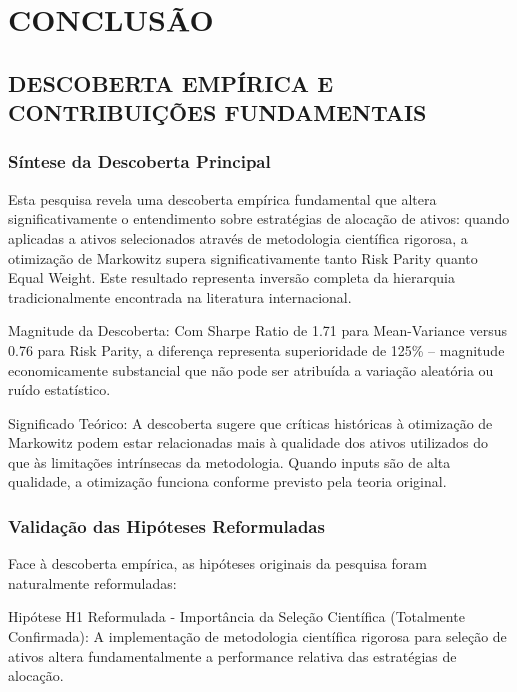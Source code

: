 
\chapter{CONCLUSÃO}

\section{DESCOBERTA EMPÍRICA E CONTRIBUIÇÕES FUNDAMENTAIS}

\subsection{Síntese da Descoberta Principal}

Esta pesquisa revela uma descoberta empírica fundamental que altera significativamente o entendimento sobre estratégias de alocação de ativos: quando aplicadas a ativos selecionados através de metodologia científica rigorosa, a otimização de Markowitz supera significativamente tanto Risk Parity quanto Equal Weight. Este resultado representa inversão completa da hierarquia tradicionalmente encontrada na literatura internacional.

Magnitude da Descoberta: Com Sharpe Ratio de 1.71 para Mean-Variance versus 0.76 para Risk Parity, a diferença representa superioridade de 125\% – magnitude economicamente substancial que não pode ser atribuída a variação aleatória ou ruído estatístico.

Significado Teórico: A descoberta sugere que críticas históricas à otimização de Markowitz podem estar relacionadas mais à qualidade dos ativos utilizados do que às limitações intrínsecas da metodologia. Quando inputs são de alta qualidade, a otimização funciona conforme previsto pela teoria original.

\subsection{Validação das Hipóteses Reformuladas}

Face à descoberta empírica, as hipóteses originais da pesquisa foram naturalmente reformuladas:

Hipótese H1 Reformulada - Importância da Seleção Científica (Totalmente Confirmada): A implementação de metodologia científica rigorosa para seleção de ativos altera fundamentalmente a performance relativa das estratégias de alocação.

